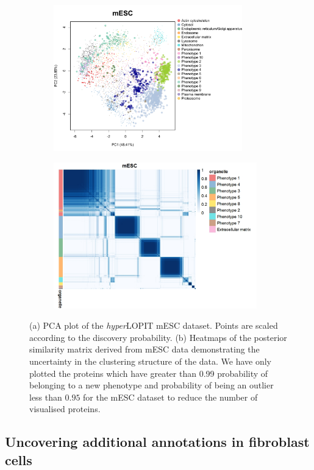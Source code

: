 \documentclass[12pt,english]{article}
\begin{document}
\begin{figure}[h]
	\begin{subfigure}[t]{0.5\textwidth}
	\centering
	\includegraphics[height=2.5in]{pcaMousehl.pdf}
	\caption{}
\end{subfigure}
\begin{subfigure}[t]{0.5\textwidth}
	\centering
	\includegraphics[height=2.5in]{heatmapMousehl.jpeg}
	\caption{}
\end{subfigure}
\caption{(a) PCA plot of the \textit{hyper}LOPIT mESC dataset. Points are scaled according to the discovery probability. (b) Heatmaps of the posterior similarity matrix derived from  mESC data demonstrating the uncertainty in the clustering structure of the data. We have only plotted the proteins which have greater than 0.99 probability of belonging to a new phenotype and probability of being an outlier less than $0.95$ for the mESC dataset to reduce the number of visualised proteins.}
\label{figure:mouse}
\end{figure}
\subsection{Uncovering additional annotations in fibroblast cells}\label{supplement:fibroblast}
\end{document}
